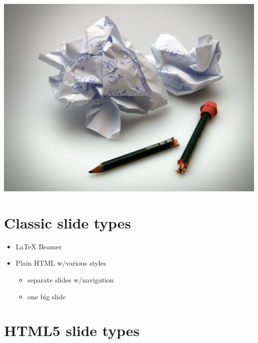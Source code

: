 \documentclass[%
twoside,                 %
final,                   %
chapterprefix=true,      %
open=right               %
10pt]{book}
\begin{document}
\begin{center}  %
  \centerline{\includegraphics[width=0.9\linewidth]{fig/broken_pen_and_paper.jpg}}
\end{center}



\section*{Classic slide types}

\begin{itemize}
 \item {\LaTeX} Beamer

 \item Plain HTML w/various styles
\begin{itemize}

   \item separate slides w/navigation

   \item one big slide
\end{itemize}

\noindent
\end{itemize}

\noindent
\section*{HTML5 slide types}
\end{document}
